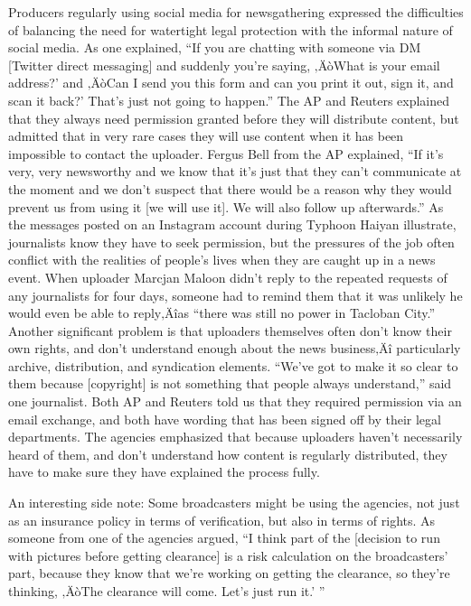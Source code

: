 \documentclass[symmetric, notoc, nobib]{towcenter-book}
\begin{document}
Producers regularly using social media for newsgathering expressed the
difficulties of balancing the need for watertight legal protection with the
informal nature of social media. As one explained, ``If you are chatting with
someone via DM [Twitter direct messaging] and suddenly you're saying,
‚ÄòWhat is your email address?' and ‚ÄòCan I send you this form and can you
print it out, sign it, and scan it back?' That's just not going to happen.''
The AP and Reuters explained that they always need permission granted
before they will distribute content, but admitted that in very rare cases they
will use content when it has been impossible to contact the uploader. Fergus
Bell from the AP explained, ``If it's very, very newsworthy and we know that
it's just that they can't communicate at the moment and we don't suspect
that there would be a reason why they would prevent us from using it [we
will use it]. We will also follow up afterwards.''
As the messages posted on an Instagram account during Typhoon Haiyan
illustrate, journalists know they have to seek permission, but the pressures
of the job often conflict with the realities of people's lives when they are
caught up in a news event. When uploader Marcjan Maloon didn't reply
to the repeated requests of any journalists for four days, someone had to
remind them that it was unlikely he would even be able to reply‚Äîas ``there
was still no power in Tacloban City.''
Another significant problem is that uploaders themselves often don't know
their own rights, and don't understand enough about the news business‚Äî
particularly archive, distribution, and syndication elements. ``We've got to
make it so clear to them because [copyright] is not something that people
always understand,'' said one journalist.
Both AP and Reuters told us that they required permission via an email
exchange, and both have wording that has been signed off by their legal
departments. The agencies emphasized that because uploaders haven't necessarily
heard of them, and don't understand how content is regularly distributed,
they have to make sure they have explained the process fully.

An interesting side note: Some broadcasters might be using the agencies, not
just as an insurance policy in terms of verification, but also in terms of rights.
As someone from one of the agencies argued, ``I think part of the [decision to
run with pictures before getting clearance] is a risk calculation on the broadcasters'
part, because they know that we're working on getting the clearance,
so they're thinking, ‚ÄòThe clearance will come. Let's just run it.' ''
\end{document}
